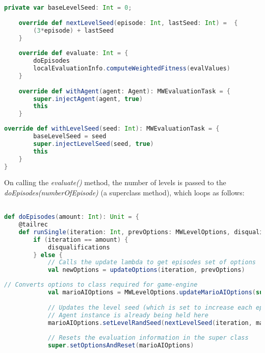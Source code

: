 \begin{minipage}{0.9\linewidth}
\centering
\begin{lstlisting}[language=scala]  
    private var baseLevelSeed: Int = 0;
    
    override def nextLevelSeed(episode: Int, lastSeed: Int) =  {
        (3*episode) + lastSeed
    }    
        
    override def evaluate: Int = {
        doEpisodes
        localEvaluationInfo.computeWeightedFitness(evalValues)
    }
  
    override def withAgent(agent: Agent): MWEvaluationTask = {
        super.injectAgent(agent, true)
        this
    }
\end{lstlisting}
\end{minipage}     
    
\begin{minipage}{0.9\linewidth}
\centering
\begin{lstlisting}[language=scala]   
    override def withLevelSeed(seed: Int): MWEvaluationTask = {
        baseLevelSeed = seed
        super.injectLevelSeed(seed, true)
        this
    }
}
\end{lstlisting}
\end{minipage}  

On calling the \emph{evaluate()} method, the number of levels is passed to the \emph{doEpisodes(numberOfEpisode)} (a superclass method), which loops as follows:

\begin{minipage}{0.9\linewidth}
\centering
\begin{lstlisting}[language=scala]

def doEpisodes(amount: Int): Unit = {
    @tailrec
    def runSingle(iteration: Int, prevOptions: MWLevelOptions, disqualifications: Int): Int = {
        if (iteration == amount) { 
            disqualifications
        } else {
            // Calls the update lambda to get episodes set of options
            val newOptions = updateOptions(iteration, prevOptions)
\end{lstlisting}
\end{minipage}     
    
\begin{minipage}{0.9\linewidth}
\centering
\begin{lstlisting}[language=scala]              
            // Converts options to class required for game-engine
            val marioAIOptions = MWLevelOptions.updateMarioAIOptions(super.options, newOptions)
            
            // Updates the level seed (which is set to increase each episode by MWEvaluationClass)
            // Agent instance is already being held here
            marioAIOptions.setLevelRandSeed(nextLevelSeed(iteration, marioAIOptions.getLevelRandSeed))
            
            // Resets the evaluation information in the super class
            super.setOptionsAndReset(marioAIOptions)
\end{lstlisting}
\end{minipage}

